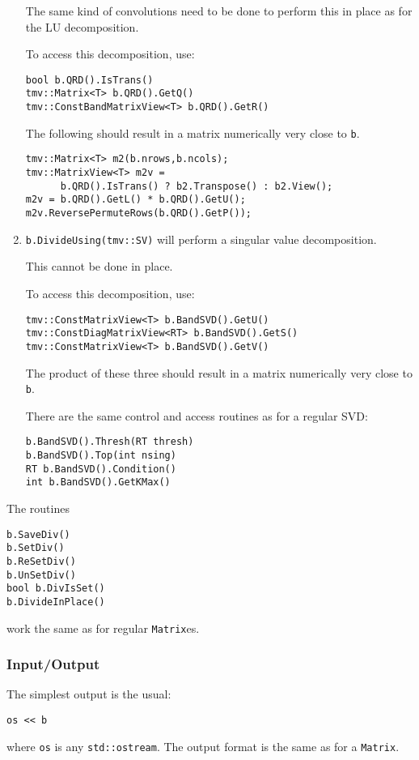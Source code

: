 \documentclass[twoside,letterpaper,11pt]{article}
\renewcommand{\tt}[1]{{\texttt {#1}}}
\begin{document}
\begin{enumerate}
The same kind of convolutions need to be done to perform this in place as 
for the LU decomposition.

To access this decomposition, use:
\begin{verbatim}
bool b.QRD().IsTrans()
tmv::Matrix<T> b.QRD().GetQ()
tmv::ConstBandMatrixView<T> b.QRD().GetR()
\end{verbatim}
The following should result in a matrix numerically very close to \tt{b}.
\begin{verbatim}
tmv::Matrix<T> m2(b.nrows,b.ncols);
tmv::MatrixView<T> m2v = 
      b.QRD().IsTrans() ? b2.Transpose() : b2.View();
m2v = b.QRD().GetL() * b.QRD().GetU();
m2v.ReversePermuteRows(b.QRD().GetP());
\end{verbatim}

\item
\tt{b.DivideUsing(tmv::SV)} will perform a singular value decomposition.

This cannot be done in place.

To access this decomposition, use:
\begin{verbatim}
tmv::ConstMatrixView<T> b.BandSVD().GetU()
tmv::ConstDiagMatrixView<RT> b.BandSVD().GetS()
tmv::ConstMatrixView<T> b.BandSVD().GetV()
\end{verbatim}
The product of these three
should result in a matrix numerically very close to \tt{b}.

There are the same control and access routines as for a regular SVD:
\begin{verbatim}
b.BandSVD().Thresh(RT thresh)
b.BandSVD().Top(int nsing)
RT b.BandSVD().Condition()
int b.BandSVD().GetKMax()
\end{verbatim}

\end{enumerate}
The routines 
\begin{verbatim}
b.SaveDiv()
b.SetDiv()
b.ReSetDiv()
b.UnSetDiv()
bool b.DivIsSet()
b.DivideInPlace()
\end{verbatim}
work the same as for regular \tt{Matrix}es.

\subsubsection{Input/Output}

The simplest output is the usual:
\begin{verbatim}
os << b
\end{verbatim}
where \tt{os} is any \tt{std::ostream}.
The output format is the same as for a \tt{Matrix}.
\end{document}
